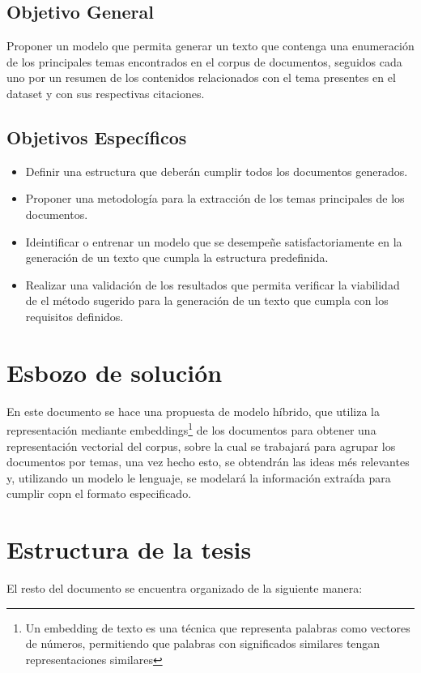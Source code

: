     \subsection{Objetivo General}

        Proponer un modelo que permita generar un texto que contenga una enumeración de los principales temas encontrados en el corpus de documentos, seguidos cada uno por un resumen de los contenidos relacionados con el tema presentes en el dataset y con sus respectivas citaciones.

    \subsection{Objetivos Específicos}

        \begin{itemize}
            \item Definir una estructura que deberán cumplir todos los documentos generados.
            \item Proponer una metodología para la extracción de los temas principales de los documentos.
            \item Ideintificar o entrenar un modelo que se desempeñe satisfactoriamente en la generación de un texto que cumpla la estructura predefinida.
            \item Realizar una validación de los resultados que permita verificar la viabilidad de el método sugerido para la generación de un texto que cumpla con los requisitos definidos.
        \end{itemize}
\section{Esbozo de solución}
    En este documento se hace una propuesta de modelo híbrido, que utiliza la representación mediante embeddings\footnote{Un embedding de texto es una técnica que representa palabras como vectores de números, permitiendo que palabras con significados similares tengan representaciones similares}
    de los documentos para obtener una representación vectorial del corpus, sobre la cual se trabajará para agrupar los documentos por temas, una vez hecho esto, se obtendrán las ideas més relevantes y, utilizando un modelo le lenguaje, se modelará la información extraída para cumplir copn el formato especificado.
\section{Estructura de la tesis}
        El resto del documento se encuentra organizado de la siguiente manera:

